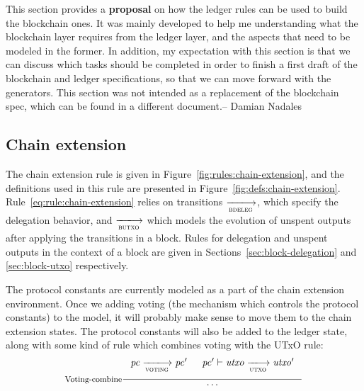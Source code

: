 \begin{note}
  This section provides a \textbf{proposal} on how the ledger rules can be used
  to build the blockchain ones. It was mainly developed to help me
  understanding what the blockchain layer requires from the ledger layer, and
  the aspects that need to be modeled in the former. In addition, my
  expectation with this section is that we can discuss which tasks should be
  completed in order to finish a first draft of the blockchain and ledger
  specifications, so that we can move forward with the generators. This section
  was not intended as a replacement of the blockchain spec, which can be found
  in a different document.-- Damian Nadales
\end{note}

\subsection{Chain extension}
\label{sec:chain-extension}

The chain extension rule is given in Figure~\ref{fig:rules:chain-extension},
and the definitions used in this rule are presented in
Figure~\ref{fig:defs:chain-extension}. Rule~\ref{eq:rule:chain-extension}
relies on transitions $\trans{bdeleg}{}$, which specify the delegation
behavior, and $\trans{butxo}{}$ which models the evolution of unspent outputs
after applying the transitions in a block. Rules for delegation and unspent
outputs in the context of a block are given in
Sections~\ref{sec:block-delegation} and \ref{sec:block-utxo} respectively.

\begin{note}
  The protocol constants are currently modeled as a part of the
  chain extension environment. Once we adding voting
  (the mechanism which controls the protocol constants)
  to the model, it will probably make sense to move them to the
  chain extension states. The protocol constants will also be
  added to the ledger state, along with some kind of rule which
  combines voting with the UTxO rule:
  \begin{equation*}
    \inference[Voting-combine]
    {
      \var{pc} \trans{voting}{} \var{pc'} &
      \var{pc'} \vdash \var{utxo} \trans{utxo}{} \var{utxo'}\\ ~ \\
    }
    {\ldots}
  \end{equation*}
\end{note}

